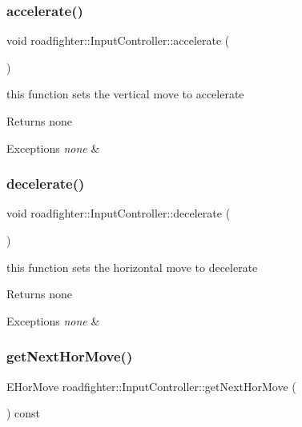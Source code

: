 \subsubsection{\texorpdfstring{accelerate()}{accelerate()}}
{\footnotesize\ttfamily void roadfighter\+::\+Input\+Controller\+::accelerate (\begin{DoxyParamCaption}{ }\end{DoxyParamCaption})}

this function sets the vertical move to accelerate \begin{DoxyReturn}{Returns}
none 
\end{DoxyReturn}

\begin{DoxyExceptions}{Exceptions}
{\em none} & \\
\hline
\end{DoxyExceptions}
\mbox{\label{classroadfighter_1_1InputController_ab7e35b651a8b388e927a7d8d1a228f80}} 
\subsubsection{\texorpdfstring{decelerate()}{decelerate()}}
{\footnotesize\ttfamily void roadfighter\+::\+Input\+Controller\+::decelerate (\begin{DoxyParamCaption}{ }\end{DoxyParamCaption})}

this function sets the horizontal move to decelerate \begin{DoxyReturn}{Returns}
none 
\end{DoxyReturn}

\begin{DoxyExceptions}{Exceptions}
{\em none} & \\
\hline
\end{DoxyExceptions}
\mbox{\label{classroadfighter_1_1InputController_aef3c083d96e5478256255aa77f2d964e}} 
\subsubsection{\texorpdfstring{get\+Next\+Hor\+Move()}{getNextHorMove()}}
{\footnotesize\ttfamily E\+Hor\+Move roadfighter\+::\+Input\+Controller\+::get\+Next\+Hor\+Move (\begin{DoxyParamCaption}{ }\end{DoxyParamCaption}) const}

